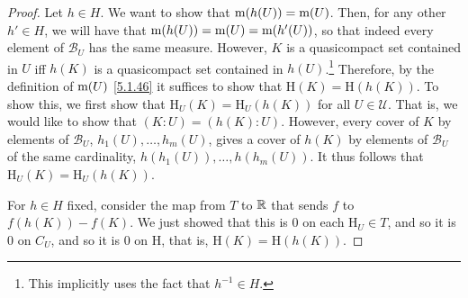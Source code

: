 \begin{thm}
\begin{savenotes}
\begin{proof}
Let $h\in H$.  We want to show that $\mathrm{m} (h(U))=\mathrm{m} (U)$.  Then, for any other $h'\in H$, we will have that $\mathrm{m} (h(U))=\mathrm{m} (U)=\mathrm{m} (h'(U))$, so that indeed every element of $\mathcal{B}_U$ has the same measure.  However, $K$ is a quasicompact set contained in $U$ iff $h(K)$ is a quasicompact set contained in $h(U)$.\footnote{This implicitly uses the fact that $h^{-1}\in H$.}  Therefore, by the definition of $\mathrm{m} (U)$ \eqref{5.1.46} it suffices to show that $\mathrm{H}(K)=\mathrm{H}(h(K))$.  To show this, we first show that $\mathrm{H}_U(K)=\mathrm{H}_U(h(K))$ for all $U\in \mathcal{U}$.  That is, we would like to show that $(K:U)=(h(K):U)$.  However, every cover of $K$ by elements of $\mathcal{B}_U$, $h_1(U),\ldots ,h_m(U)$, gives a cover of $h(K)$ by elements of $\mathcal{B}_U$ of the same cardinality, $h(h_1(U)),\ldots ,h(h_m(U))$.  It thus follows that $\mathrm{H}_U(K)=\mathrm{H}_U(h(K))$.

For $h\in H$ fixed, consider the map from $T$ to $\mathbb{R}$ that sends $f$ to $f(h(K))-f(K)$.  We just showed that this is $0$ on each $\mathrm{H}_U\in T$, and so it is $0$ on $C_U$, and so it is $0$ on $\mathrm{H}$, that is, $\mathrm{H}(K)=\mathrm{H}(h(K))$.

\end{proof}
\end{savenotes}
\end{thm}